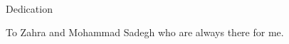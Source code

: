 
\renewcommand{\baselinestretch}{2}
\small\normalsize
\hbox{\ }
 
\vspace{.5in}

\begin{center}
\large{Dedication}
\end{center} 

To Zahra and Mohammad Sadegh who are always there for me.